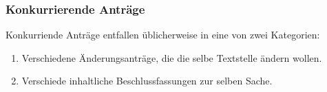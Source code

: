\subsubsection*{Konkurrierende Anträge%
  \label{konkurrierende-antrage}%
}

Konkurriende Anträge entfallen üblicherweise in eine von zwei Kategorien:

\begin{enumerate}
\item Verschiedene Änderungsanträge, die die selbe Textstelle ändern wollen.

\item Verschiede inhaltliche Beschlussfassungen zur selben Sache.
\end{enumerate}

\newpage